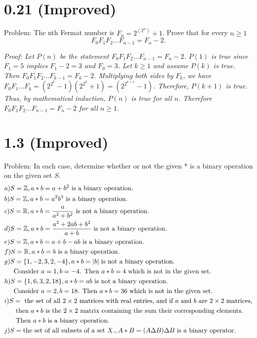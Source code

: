 \documentclass{scrartcl}
\begin{document}
\section{0.21 (Improved)}
Problem: The nth Fermat number is $F_n=2^{(2^n)}+1$. Prove that for every $n\geq1$ \[F_0F_1F_2...F_{n-1}=F_n-2.\]

\em Proof: \em Let $P(n)$ be the statement $F_0F_1F_2...F_{n-1}=F_n-2$. $P(1)$ is true since $F_1=5$ implies $F_1-2=3$ and $F_0=3$. Let $k\geq1$ and assume $P(k)$ is true. Then $F_0F_1F_2...F_{k-1}=F_k-2$. Multiplying both sides by $F_k$, we have $F_0F_1...F_k=(2^{2^k}-1)(2^{2^k}+1)=(2^{2^{k+1}}-1)$. Therefore, $P(k+1)$ is true. Thus, by mathematical induction, $P(n)$ is true for all $n$. Therefore $F_0F_1F_2...F_{n-1}=F_n-2$ for all $n\geq1$.\newpage

\section{1.3 (Improved)}
Problem: In each case, determine whether or not the given * is a binary operation on the given set $S$.\newline
\begin{align*}
&a) S=\mathbb{Z}, a*b=a+b^2\text{ is a binary operation.}\\
&b) S=\mathbb{Z}, a*b=a^2b^3\text{ is a binary operation.}\\
&c) S=\mathbb{R}, a*b=\frac{a}{a^2+b^2}\text{ is not a binary operation.}\\
&d) S=\mathbb{Z}, a*b=\frac{a^2+2ab+b^2}{a+b}\text{ is not a binary operation.}\\
&e) S=\mathbb{Z}, a*b=a+b-ab\text{ is a binary operation.}\\
&f) S=\mathbb{R}, a*b=b\text{ is a binary operation.}\\
&g) S=\{1,-2,3,2,-4\}, a*b=|b|\text{ is not a binary operation.}\\
&\text{\hspace{5 mm}Consider $a=1, b=-4$. Then $a*b=4$ which is not in the given set.}\\
&h) S=\{1,6,3,2,18\}, a*b=ab\text{ is not a binary operation.}\\
&\text{\hspace{5 mm}Consider $a=2, b=18$. Then $a*b=36$ which is not in the given set.}\\
&i) S=\text{ the set of all $2\times2$ matrices with real entries, and if $a$ and $b$ are $2\times2$ matrices,}\\&\text{\hspace{5 mm} then $a*b$ is the $2\times2$ matrix containing the sum their corresponding elements.}\\&\hspace{5 mm}\text{ Then $a*b$ is a binary operation.}\\
&j) S=\text{the set of all subsets of a set $X$.}, A*B=(A\Delta B)\Delta B\text{ is a binary operator.}
\end{align*}
\end{document}

